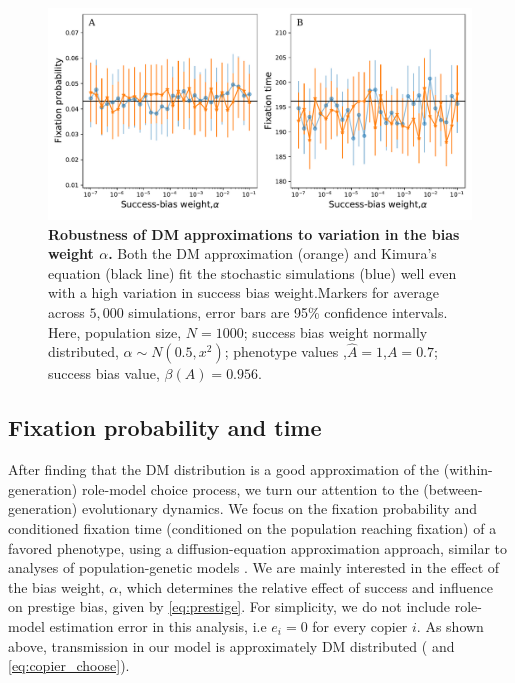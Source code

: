 \documentclass[12pt]{extarticle}
\begin{document}
\begin{figure}
    \includegraphics[width=\linewidth]{../figures/final/full_vs_dm_changing_alpha.pdf}
   \caption{\textbf{Robustness of DM approximations to variation in the bias weight $\alpha$.} 
   Both the DM approximation (orange) and Kimura's equation (black line) fit the stochastic simulations (blue) well even with a high variation in success bias weight.Markers for average across $5,000$ simulations, error bars are 95\% confidence intervals.
  Here, population size, $N=1000$; success bias weight normally distributed, $\alpha\sim N(0.5,x^2)$; phenotype values ,$\hat{A}=1$,$A=0.7$; success bias value, $\beta(A)=0.956$.}	
  \label{fig:hetro_alpha}
\end{figure}


\subsection*{Fixation probability and time}

After finding that the DM distribution is a good approximation of the (within-generation) role-model choice process, we turn our attention to the (between-generation) evolutionary dynamics.
We focus on the fixation probability and conditioned fixation time (conditioned on the population reaching fixation) of a favored phenotype, using a diffusion-equation approximation approach, similar to analyses of population-genetic models \citep{kimura,kimura_average,otto_fixation}.
We are mainly interested in the effect of the bias weight, $\alpha$, which determines the relative effect of success and influence on prestige bias, given by \cref{eq:prestige}.
For simplicity, we do not include role-model estimation error in this analysis, i.e $e_i=0$ for every copier $i$.
As shown above, transmission in our model is approximately DM distributed ( and \cref{eq:copier_choose}).
\end{document}
